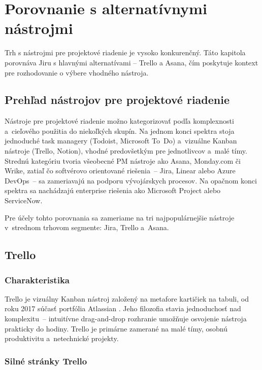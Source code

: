 
\chapter{Porovnanie s alternatívnymi nástrojmi}\label{ch:porovnanie}

Trh s nástrojmi pre projektové riadenie je vysoko konkurenčný. Táto kapitola porovnáva Jiru s hlavnými alternatívami -- Trello a Asana, čím poskytuje kontext pre rozhodovanie o výbere vhodného nástroja.

\section{Prehľad nástrojov pre projektové riadenie}

Nástroje pre projektové riadenie možno kategorizovať podľa komplexnosti a~cieľového použitia do niekoľkých skupín. Na jednom konci spektra stoja jednoduché task managery (Todoist, Microsoft To~Do) a~vizuálne Kanban nástroje (Trello, Notion), vhodné predovšetkým pre jednotlivcov a~malé tímy. Strednú kategóriu tvoria všeobecné PM nástroje ako Asana, Monday.com či Wrike, zatiaľ čo softvérovo orientované riešenia~-- Jira, Linear alebo Azure DevOps~-- sa zameriavajú na podporu vývojárskych procesov. Na opačnom konci spektra sa nachádzajú enterprise riešenia ako Microsoft Project alebo ServiceNow.

Pre účely tohto porovnania sa zameriame na tri najpopulárnejšie nástroje v~strednom trhovom segmente: Jira, Trello a~Asana.

\section{Trello}

\subsection{Charakteristika}

Trello je vizuálny Kanban nástroj založený na metafore kartičiek na tabuli, od roku 2017 súčasť portfólia Atlassian \cite{trello2024}. Jeho filozofia stavia jednoduchosť nad komplexitu~-- intuitívne drag-and-drop rozhranie umožňuje osvojenie nástroja prakticky do hodiny. Trello je primárne zamerané na malé tímy, osobnú produktivitu a~netechnické projekty.

\subsection{Silné stránky Trello}

